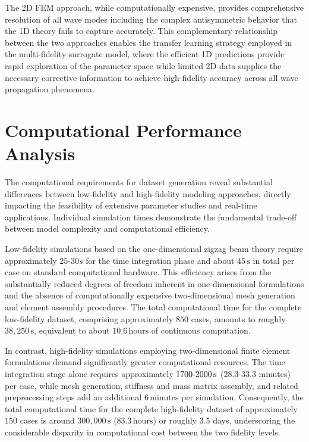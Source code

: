 \documentclass[12pt,a4paper]{report}
\begin{document}
The 2D FEM approach, while computationally expensive, provides comprehensive resolution of all wave modes including the complex antisymmetric behavior that the 1D theory fails to capture accurately. This complementary relationship between the two approaches enables the transfer learning strategy employed in the multi-fidelity surrogate model, where the efficient 1D predictions provide rapid exploration of the parameter space while limited 2D data supplies the necessary corrective information to achieve high-fidelity accuracy across all wave propagation phenomena. 

\section{Computational Performance Analysis}

The computational requirements for dataset generation reveal substantial differences between low-fidelity and high-fidelity modeling approaches, directly impacting the feasibility of extensive parameter studies and real-time applications. Individual simulation times demonstrate the fundamental trade-off between model complexity and computational efficiency.

Low-fidelity simulations based on the one-dimensional zigzag beam theory require approximately $25$-$30s$ for the time integration phase and about \(45\,\text{s}\) in total per case on standard computational hardware. This efficiency arises from the substantially reduced degrees of freedom inherent in one-dimensional formulations and the absence of computationally expensive two-dimensional mesh generation and element assembly procedures. The total computational time for the complete low-fidelity dataset, comprising approximately \(850\) cases, amounts to roughly \(38{,}250\,\text{s}\), equivalent to about \(10.6\,\text{hours}\) of continuous computation.

\bigskip

In contrast, high-fidelity simulations employing two-dimensional finite element formulations demand significantly greater computational resources. The time integration stage alone requires approximately \(1700\text- 2000\,\text{s}\) (28.3-33.3 minutes) per case, while mesh generation, stiffness and mass matrix assembly, and related preprocessing steps add an additional \(6\,\text{minutes}\) per simulation. Consequently, the total computational time for the complete high-fidelity dataset of approximately \(150\) cases is around \(300{,}000\,\text{s}\) (\(83.3\,\text{hours}\)) or roughly 3.5 days, underscoring the considerable disparity in computational cost between the two fidelity levels.
\end{document}
